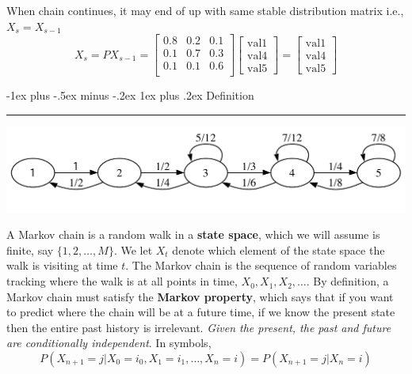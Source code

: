 \documentclass[letterpaper, 10.5pt,landscape]{article}
\makeatletter
\renewcommand{\subsubsection}{\@startsection{subsubsection}{3}{0mm}%
                                {-1ex plus -.5ex minus -.2ex}%
                                {1ex plus .2ex}%
                                {\normalfont\small\bfseries}}
\makeatother
\begin{document}
\begin{multicols*}{3}
When chain continues, it may end of up with same stable distribution matrix i.e., $X_{s} = X_{s-1}$
\vspace{-3pt}
\[ X_{s} = PX_{s-1} = 
\begin{bmatrix}
  0.8 & 0.2 & 0.1 \\
  0.1 & 0.7 & 0.3 \\
  0.1 & 0.1 & 0.6 \\
\end{bmatrix}
\begin{bmatrix}
  \text{val}1 \\
  \text{val}4 \\
  \text{val}5
\end{bmatrix} =
\begin{bmatrix}
  \text{val}1 \\
  \text{val}4 \\
  \text{val}5
\end{bmatrix}
\] 




\subsubsection{Definition} {\color{teal}\hrule height 0.5pt} \smallskip

\begin{center}
    \begin{minipage}{\linewidth}
    \includegraphics[width=\textwidth]{figures/chainA.pdf}
    \end{minipage}
\end{center}

A Markov chain is a random walk in a \textbf{state space}, which we will assume is finite, say $\{1, 2, \dots, M\}$. We let $X_t$ denote which element of the state space the walk is visiting at time $t$. The Markov chain is the sequence of random variables tracking where the walk is at all points in time, $X_0, X_1, X_2, \dots$. By definition, a Markov chain must satisfy the \textbf{Markov property}, which says that if you want to predict where the chain will be at a future time, if we know the present state then the entire past history is irrelevant.  \emph{Given the present, the past and future are conditionally independent}. In symbols,
\[P(X_{n+1} = j | X_0 = i_0, X_1 = i_1, \dots, X_n = i) = P(X_{n+1} = j | X_n = i)\]



\end{multicols*}
\end{document}
